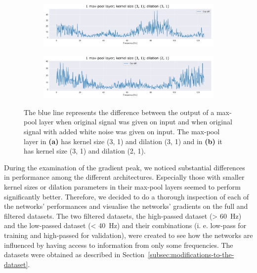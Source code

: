 \begin{figure}
\centering
\begin{subfigure}[b]{\textwidth}
   \includegraphics[width=1\linewidth]{img/ch4/absVel-maxpool-k3-d3}
   \caption{}
   \label{fig:maxpool-k3-d3} 
\end{subfigure}

\begin{subfigure}[b]{\textwidth}
   \includegraphics[width=1\linewidth]{img/ch4/absVel-maxpool-k3-d2}
   \caption{}
   \label{fig:maxpool-k3-d2}
\end{subfigure}

\caption[]{The blue line represents the difference between the output of a max-pool layer when original signal was given on input and when original signal with added white noise was given on input. The max-pool layer in \textbf{(a)} has kernel size (3, 1) and dilation (3, 1) and in \textbf{(b)} it has kernel size (3, 1) and dilation (2, 1).} 
\label{fig:max-pool-changes}
\end{figure}

During the examination of the gradient peak, we noticed substantial differences in performance among the different architectures.
Especially those with smaller kernel sizes or dilation parameters in their max-pool layers seemed to perform significantly better.
Therefore, we decided to do a thorough inspection of each of the networks' performances and visualise the networks' gradients on the full and filtered datasets. 
The two filtered datasets, the high-passed dataset (> 60~Hz) and the low-passed dataset (< 40~Hz) and their combinations (i. e. low-pass for training and high-passed for validation), were created to see how the networks are influenced by having access to information from only some frequencies. The datasets were obtained as described in Section~\ref{subsec:modifications-to-the-dataset}.

